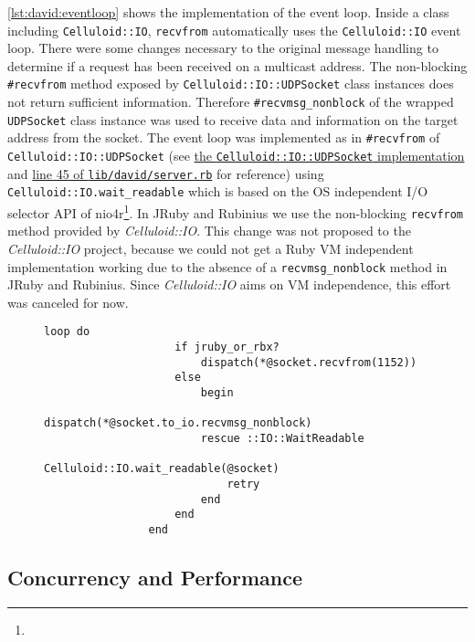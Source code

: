 		\autoref{lst:david:eventloop} shows the implementation of the event
		loop. Inside a class including \texttt{Celluloid::IO},
		\texttt{recvfrom} automatically uses the \texttt{Celluloid::IO} event
		loop. There were some changes necessary to the original message
		handling to determine if a request has been received on a multicast
		address. The non-blocking \texttt{\#recvfrom} method exposed by
		\texttt{Celluloid::IO::UDPSocket} class instances does not return
		sufficient information. Therefore \texttt{\#recvmsg\_nonblock} of the
		wrapped \texttt{UDPSocket} class instance was used to receive data and
		information on the target address from the socket. The event loop was
		implemented as in \texttt{\#recvfrom} of
		\texttt{Celluloid::IO::UDPSocket} (see
		\href{https://github.com/celluloid/celluloid-io/blob/9ccce9ba40535b4fa204e69f312bc2fe53dda3a1/lib/celluloid/io/udp_socket.rb#L19}{the
		\texttt{Celluloid::IO::UDPSocket} implementation} and
		\href{https://github.com/nning/david/blob/0.4.3/lib/david/server.rb#L45}{line
		45 of \texttt{lib/david/server.rb}} for reference) using
		\texttt{Celluloid::IO.wait\_readable} which is based on the \ac{OS}
		independent I/O selector \ac{API} of nio4r\footnote{\urlNio}. In JRuby
		and Rubinius we use the non-blocking \texttt{recvfrom} method provided
		by \emph{Celluloid::IO}. This change was not proposed to the
		\emph{Celluloid::IO} project, because we could not get a Ruby \ac{VM}
		independent implementation working due to the absence of a
		\texttt{recvmsg\_nonblock} method in JRuby and Rubinius. Since
		\emph{Celluloid::IO} aims on \ac{VM} independence, this effort was
		canceled for now.

		\begin{figure}
			\begin{lstlisting}[gobble=8,caption={Server Event Loop},label={lst:david:eventloop}]
				loop do
					if jruby_or_rbx?
						dispatch(*@socket.recvfrom(1152))
					else
						begin
							dispatch(*@socket.to_io.recvmsg_nonblock)
						rescue ::IO::WaitReadable
							Celluloid::IO.wait_readable(@socket)
							retry
						end
					end
				end
			\end{lstlisting}
		\end{figure}
		
	\subsection{Concurrency and Performance}

